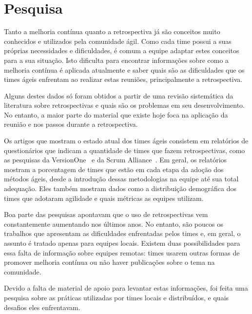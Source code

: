 \section{Pesquisa}

Tanto a melhoria contínua quanto a retrospectiva já são conceitos muito conhecidos e utilizados pela comunidade ágil. Como cada time possui a suas próprias necessidades e dificuldades, é comum a equipe adaptar estes conceitos para a sua situação. Isto dificulta para encontrar informações sobre como a melhoria contínua é aplicada atualmente e saber quais são as dificuldades que os times ágeis enfrentam ao realizar estas reuniões, principalmente a retrospectiva. 

Alguns destes dados só foram obtidos a partir de uma revisão sistemática da literatura sobre retrospectivas e quais são os problemas em seu desenvolvimento. No entanto, a maior parte do material que existe hoje foca na aplicação da reunião e nos passos durante a retrospectiva.

Os artigos que mostram o estado atual dos times ágeis consistem em relatórios de questionários que indicam a quantidade de times que fazem retrospectivas, como as pesquisas da VersionOne~\cite{versionOne} e da Scrum Alliance~\cite{scrumAlliance}. Em geral, os relatórios mostram a porcentagem de times que estão em cada etapa da adoção dos métodos ágeis, desde a introdução dessas metodologias na equipe até sua total adequação. Eles também mostram dados como a distribuição demográfica dos times que adotaram agilidade e quais métricas as equipes utilizam.

Boa parte das pesquisas apontavam que o uso de retrospectivas vem constantemente aumentando nos últimos anos. No entanto, são poucos os trabalhos que apresentam as dificuldades enfrentadas pelos times e, em geral, o assunto é tratado apenas para equipes locais. Existem duas possibilidades para essa falta de informação sobre equipes remotas: times usarem outras formas de promover melhoria contínua ou não haver publicações sobre o tema na comunidade.

Devido a falta de material de apoio para levantar estas informações, foi feita uma pesquisa sobre as práticas utilizadas por times locais e distribuídos, e quais desafios eles enfrentavam.


